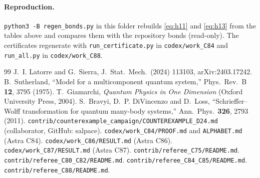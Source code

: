 \documentclass[11pt]{article}
\newcommand{\repo}[1]{\texttt{#1}}
\begin{document}
\paragraph{Reproduction.} \repo{python3 -B regen\_bonds.py} in this folder rebuilds \eqref{eq:h11} and \eqref{eq:h13} from the tables above and compares them with the repository bonds (read-only). The certificates regenerate with \repo{run\_certificate.py} in \repo{codex/work\_C84} and \repo{run\_all.py} in \repo{codex/work\_C88}.

\begin{thebibliography}{99}
 J.~I. Latorre and G.~Sierra, J.\ Stat.\ Mech.\ (2024) 113103, arXiv:2403.17242.
 B.~Sutherland, ``Model for a multicomponent quantum system,'' Phys.\ Rev.\ B \textbf{12}, 3795 (1975).
 T.~Giamarchi, \textit{Quantum Physics in One Dimension} (Oxford University Press, 2004).
 S.~Bravyi, D.~P. DiVincenzo and D.~Loss, ``Schrieffer--Wolff transformation for quantum many-body systems,'' Ann.\ Phys.\ \textbf{326}, 2793 (2011).
 \repo{contrib/counterexample\_campaign/COUNTEREXAMPLE\_D24.md} (collaborator, GitHub: salpace).
 \repo{codex/work\_C84/PROOF.md} and \repo{ALPHABET.md} (Astra C84).
 \repo{codex/work\_C86/RESULT.md} (Astra C86).
 \repo{codex/work\_C87/RESULT.md} (Astra C87).
 \repo{contrib/referee\_C75/README.md}.
 \repo{contrib/referee\_C80\_C82/README.md}.
 \repo{contrib/referee\_C84\_C85/README.md}.
 \repo{contrib/referee\_C88/README.md}.
\end{thebibliography}
\end{document}
